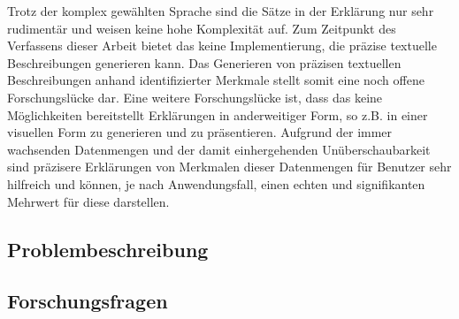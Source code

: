 Trotz der komplex gewählten Sprache sind die Sätze in der Erklärung nur sehr rudimentär und weisen keine hohe Komplexität auf.
Zum Zeitpunkt des Verfassens dieser Arbeit bietet das \gmaf{} keine Implementierung, die präzise textuelle Beschreibungen generieren kann.
Das Generieren von präzisen textuellen Beschreibungen anhand identifizierter Merkmale stellt somit eine noch offene Forschungslücke dar. 
Eine weitere Forschungslücke ist, dass das \gmaf{} keine Möglichkeiten bereitstellt Erklärungen in anderweitiger Form, so z.B. in einer visuellen Form zu generieren und zu präsentieren.
Aufgrund der immer wachsenden Datenmengen und der damit einhergehenden Unüberschaubarkeit sind präzisere Erklärungen von Merkmalen dieser Datenmengen für Benutzer sehr hilfreich und können, je nach Anwendungsfall, einen echten und signifikanten Mehrwert für diese darstellen.

\clearpage

\subsection{Problembeschreibung}
\label{sec1:intro:subsec:problems}

\clearpage

\subsection{Forschungsfragen}
\label{sec1:intro:subsec:research-questions}



\clearpage

